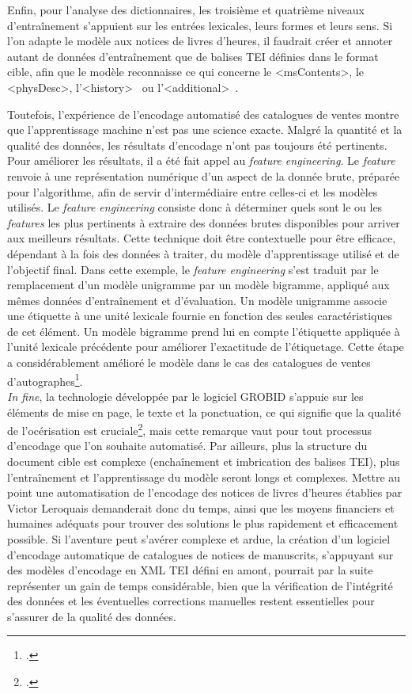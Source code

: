 \documentclass[a4paper,12pt,twoside]{book}
\begin{document}
Enfin, pour l'analyse des dictionnaires, les troisième et quatrième niveaux d'entraînement s'appuient sur les entrées lexicales, leurs formes et leurs sens. Si l'on adapte le modèle aux notices de livres d'heures, il faudrait créer et annoter autant de données d'entraînement que de balises TEI définies dans le format cible, afin que le modèle reconnaisse ce qui concerne le \textless msContents\textgreater, le \textless physDesc\textgreater, l'\textless history\textgreater~ ou l'\textless additional\textgreater~.
	
	Toutefois, l'expérience de l'encodage automatisé des catalogues de ventes montre que l'apprentissage machine n'est pas une science exacte. Malgré la quantité et la qualité des données, les résultats d'encodage n'ont pas toujours été pertinents. Pour améliorer les résultats, il a été fait appel au \textit{feature engineering}. Le \textit{feature} renvoie à une représentation numérique d'un aspect de la donnée brute, préparée pour l'algorithme, afin de servir d'intermédiaire entre celles-ci et les modèles utilisés. Le \textit{feature engineering} consiste donc à déterminer quels sont le ou les \textit{features} les plus pertinents à extraire des données brutes disponibles pour arriver aux meilleurs résultats. Cette technique doit être contextuelle pour être efficace, dépendant à la fois des données à traiter, du modèle d'apprentissage utilisé et de l'objectif final. Dans cette exemple, le \textit{feature engineering} s'est traduit par le remplacement d’un modèle unigramme par un modèle bigramme, appliqué aux mêmes données d’entraînement et d’évaluation. Un modèle unigramme associe une étiquette à une unité lexicale fournie en fonction des seules caractéristiques de cet élément. Un modèle bigramme prend lui en compte l’étiquette appliquée à l'unité lexicale précédente pour améliorer l’exactitude de l’étiquetage. Cette étape a considérablement amélioré le modèle dans le cas des catalogues de ventes d'autographes\footcite[p. 42-44]{encoder_auto_catalogue}. \\
	
	\textit{In fine}, la technologie développée par le logiciel GROBID s'appuie sur les éléments de mise en page, le texte et la ponctuation, ce qui signifie que la qualité de l'océrisation est cruciale\footcite[p. 59]{Grobid_catalogues}, mais cette remarque vaut pour tout processus d'encodage que l'on souhaite automatisé. Par ailleurs, plus la structure du document cible est complexe (enchaînement et imbrication des balises TEI), plus l'entraînement et l'apprentissage du modèle seront longs et complexes. Mettre au point une automatisation de l'encodage des notices de livres d'heures établies par Victor Leroquais demanderait donc du temps, ainsi que les moyens financiers et humaines adéquats pour trouver des solutions le plus rapidement et efficacement possible. Si l'aventure peut s'avérer complexe et ardue, la création d'un logiciel d'encodage automatique de catalogues de notices de manuscrits, s'appuyant sur des modèles d'encodage en XML TEI défini en amont, pourrait par la suite représenter un gain de temps considérable, bien que la vérification de l'intégrité des données et les éventuelles corrections manuelles restent essentielles pour s'assurer de la qualité des données. \\
	
\end{document}
